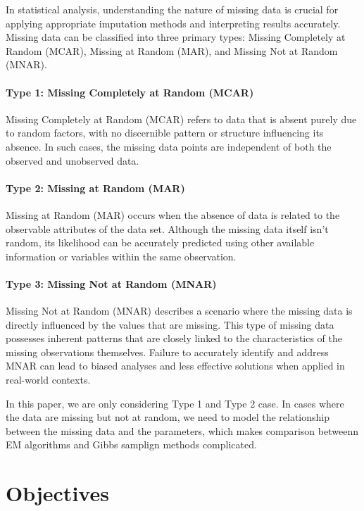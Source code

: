 \documentclass[12pt]{article}
\begin{document}
In statistical analysis, understanding the nature of missing data is crucial for applying appropriate imputation methods and interpreting results accurately. Missing data can be classified into three primary types: Missing Completely at Random (MCAR), Missing at Random (MAR), and Missing Not at Random (MNAR). 

\paragraph{Type 1: Missing Completely at Random (MCAR)}

Missing Completely at Random (MCAR) refers to data that is absent purely due to random factors, with no discernible pattern or structure influencing its absence. In such cases, the missing data points are independent of both the observed and unobserved data.

\paragraph{Type 2: Missing at Random (MAR)}

Missing at Random (MAR) occurs when the absence of data is related to the observable attributes of the data set. Although the missing data itself isn't random, its likelihood can be accurately predicted using other available information or variables within the same observation.

\paragraph{Type 3: Missing Not at Random (MNAR)}

Missing Not at Random (MNAR) describes a scenario where the missing data is directly influenced by the values that are missing. This type of missing data possesses inherent patterns that are closely linked to the characteristics of the missing observations themselves. Failure to accurately identify and address MNAR can lead to biased analyses and less effective solutions when applied in real-world contexts.

In this paper, we are only considering Type 1 and Type 2 case. In cases where the data are missing but not at random, we need to model the relationship between the missing data and the parameters\cite{Gelman2013}, which makes comparison betweenn EM algorithms and Gibbs samplign methods complicated.

\section{Objectives}
\end{document}
